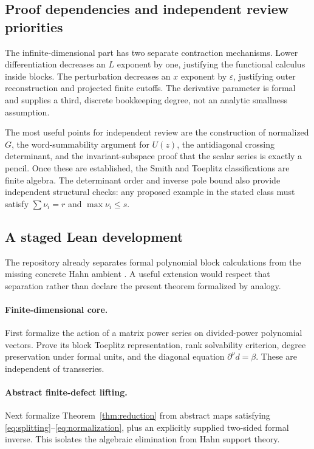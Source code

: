 \documentclass[11pt,a4paper]{article}
\numberwithin{equation}{section}
\theoremstyle{definition}
\theoremstyle{remark}
\theoremstyle{definition}
\newcommand{\eps}{\varepsilon}
\begin{document}
\subsection{Proof dependencies and independent review priorities}
The infinite-dimensional part has two separate contraction mechanisms. Lower differentiation decreases an $L$ exponent by one, justifying the functional calculus inside blocks. The perturbation decreases an $x$ exponent by $\eps$, justifying outer reconstruction and projected finite cutoffs. The derivative parameter is formal and supplies a third, discrete bookkeeping degree, not an analytic smallness assumption.

The most useful points for independent review are the construction of normalized $G$, the word-summability argument for $U(z)$, the antidiagonal crossing determinant, and the invariant-subspace proof that the scalar series is exactly a pencil. Once these are established, the Smith and Toeplitz classifications are finite algebra. The determinant order and inverse pole bound also provide independent structural checks: any proposed example in the stated class must satisfy $\sum\nu_i=r$ and $\max\nu_i\le s$.

\subsection{A staged Lean development}
The repository already separates formal polynomial block calculations from the missing concrete Hahn ambient \cite{repo-docs,repo-block}. A useful extension would respect that separation rather than declare the present theorem formalized by analogy.

\paragraph{Finite-dimensional core.}
First formalize the action of a matrix power series on divided-power polynomial vectors. Prove its block Toeplitz representation, rank solvability criterion, degree preservation under formal units, and the diagonal equation $\partial^\nu d=\beta$. These are independent of transseries.

\paragraph{Abstract finite-defect lifting.}
Next formalize Theorem~\ref{thm:reduction} from abstract maps satisfying \eqref{eq:splitting}--\eqref{eq:normalization}, plus an explicitly supplied two-sided formal inverse. This isolates the algebraic elimination from Hahn support theory.
\end{document}
